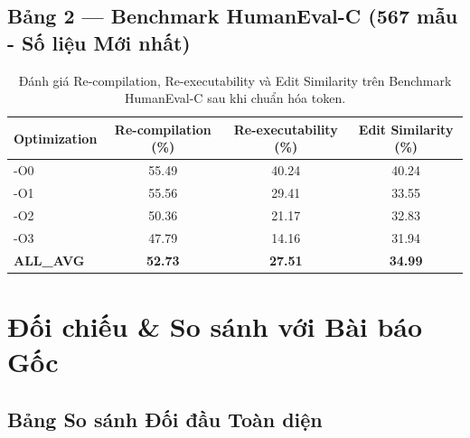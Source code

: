\documentclass[11pt,a4paper]{article}
\begin{document}
\subsection{Bảng 2 — Benchmark HumanEval-C (567 mẫu - Số liệu Mới nhất)}

\begin{table}[h]
\centering
\caption{Đánh giá Re-compilation, Re-executability và Edit Similarity trên Benchmark HumanEval-C sau khi chuẩn hóa token.}
\label{tab:humaneval_fixed}
\begin{tabular}{lccc}
\toprule
\textbf{Optimization} & \textbf{Re-compilation (\%)} & \textbf{Re-executability (\%)} & \textbf{Edit Similarity (\%)} \\
\midrule
-O0      & 55.49 & 40.24 & 40.24 \\
-O1      & 55.56 & 29.41 & 33.55 \\
-O2      & 50.36 & 21.17 & 32.83 \\
-O3      & 47.79 & 14.16 & 31.94 \\
\midrule
\textbf{ALL\_AVG} & \textbf{52.73} & \textbf{27.51} & \textbf{34.99} \\
\bottomrule
\end{tabular}
\end{table}

\section{Đối chiếu \& So sánh với Bài báo Gốc}

\subsection{Bảng So sánh Đối đầu Toàn diện}
\end{document}
